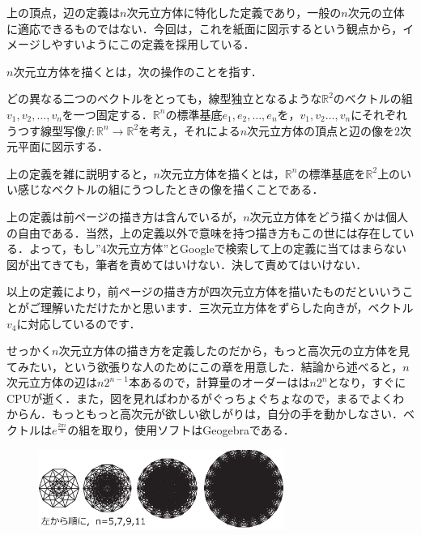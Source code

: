 \documentclass[./main]{subfiles} %
\begin{document}
\rem
上の頂点，辺の定義は$n$次元立方体に特化した定義であり，一般の$n$次元の立体に適応できるものではない．今回は，これを紙面に図示するという観点から，イメージしやすいようにこの定義を採用している．


$n$次元立方体を描くとは，次の操作のことを指す．

どの異なる二つのベクトルをとっても，線型独立となるような$\mathbb{R}^2$のベクトルの組$v_1, v_2 , \ldots , v_n$を一つ固定する．$\mathbb{R}^n$の標準基底$e_1 , e_2 , \ldots , e_n$を，$v_1,v_2 \ldots ,v_n$にそれぞれうつす線型写像$f \colon \mathbb{R}^n \rightarrow \mathbb{R}^2$を考え，それによる$n$次元立方体の頂点と辺の像を$2$次元平面に図示する．

\rem
上の定義を雑に説明すると，$n$次元立方体を描くとは，$\mathbb{R}^n$の標準基底を$\mathbb{R}^2$上のいい感じなベクトルの組にうつしたときの像を描くことである．

\rem

上の定義は前ページの描き方は含んでいるが，$n$次元立方体をどう描くかは個人の自由である．当然，上の定義以外で意味を持つ描き方もこの世には存在している．よって，もし''$4$次元立方体''とGoogleで検索して上の定義に当てはまらない図が出てきても，筆者を責めてはいけない．決して責めてはいけない．

以上の定義により，前ページの描き方が四次元立方体を描いたものだといいうことがご理解いただけたかと思います．三次元立方体をずらした向きが，ベクトル$v_4$に対応しているのです．

せっかく$n$次元立方体の描き方を定義したのだから，もっと高次元の立方体を見てみたい，という欲張りな人のためにこの章を用意した．結論から述べると，$n$次元立方体の辺は$n2^{n-1}$本あるので，計算量のオーダーはは$n2^n$となり，すぐに{\rm CPU}が逝く．また，図を見ればわかるがぐっちょぐちょなので，まるでよくわからん．もっともっと高次元が欲しい欲しがりは，自分の手を動かしなさい．ベクトルは$e^{\frac{2\pi i}{n}}$の組を取り，使用ソフトは{\rm Geogebra}である．

\begin{figure}[h]
\begin{center}
\includegraphics[width=80mm]{mask_rittai4.eps}
\end{center}
\end{figure}
\end{document}
